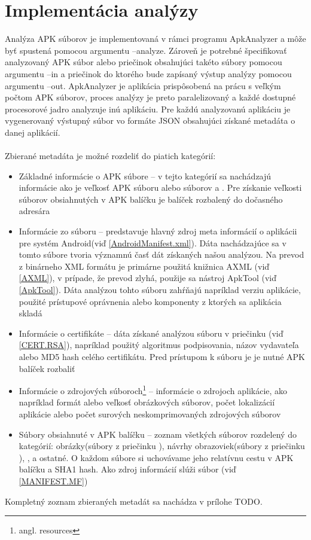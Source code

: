 \section{Implementácia analýzy}
Analýza APK súborov je implementovaná v rámci programu ApkAnalyzer a môže byť spustená pomocou argumentu –analyze. Zároveň je potrebné špecifikovať analyzovaný APK súbor alebo priečinok obsahujúci takéto súbory pomocou argumentu –in a priečinok do ktorého bude zapísaný výstup analýzy pomocou argumentu –out. ApkAnalyzer je aplikácia prispôsobená na prácu s veľkým počtom APK súborov, proces analýzy je preto paralelizovaný a každé dostupné procesorové jadro analyzuje inú aplikáciu. Pre každú analyzovanú aplikáciu je vygenerovaný výstupný súbor vo formáte JSON obsahujúci získané metadáta o danej aplikácií. \\\\
Zbierané metadáta je možné rozdeliť do piatich kategórií:
\begin{itemize}
\item Základné informácie o APK súbore -- v tejto kategórií sa nachádzajú informácie ako je veľkosť APK súboru alebo súborov  a . Pre získanie veľkosti súborov obsiahnutých v APK balíčku je balíček rozbalený do dočasného adresára
\item Informácie zo súboru  --  predstavuje hlavný zdroj meta informácií o aplikácii pre systém Android(viď \ref{AndroidManifest.xml}). Dáta nachádzajúce sa v tomto súbore tvoria významnú časť dát získaných našou analýzou. Na prevod z binárneho XML formátu je primárne použitá knižnica AXML (viď \ref{AXML}), v prípade, že prevod zlyhá, použije sa nástroj ApkTool (viď \ref{ApkTool}). Dáta analýzou tohto súboru zahŕňajú napríklad verziu aplikácie, použité prístupové oprávnenia alebo komponenty z ktorých sa aplikácia skladá
\item Informácie o certifikáte -- dáta získané analýzou súboru  v priečinku (viď \ref{CERT.RSA}), napríklad použitý algoritmus podpisovania, názov vydavateľa alebo MD5 hash celého certifikátu. Pred prístupom k súboru je  je nutné APK balíček rozbaliť
\item Informácie o zdrojových súboroch\footnote{angl. resources} -- informácie o zdrojoch aplikácie, ako napríklad formát alebo veľkosť obrázkových súborov, počet lokalizácií aplikácie alebo počet surových neskomprimovaných zdrojových súborov
\item Súbory obsiahnuté v APK balíčku -- zoznam všetkých súborov rozdelený do kategórií: obrázky(súbory z priečinku ), návrhy obrazoviek(súbory z priečinku ), ,  a ostatné. O každom súbore si uchovávame jeho relatívnu cestu v APK balíčku a SHA1 hash. Ako zdroj informácií slúži súbor  (viď \ref{MANIFEST.MF})
\end{itemize}

\noindent Kompletný zoznam zbieraných metadát sa nachádza v prílohe TODO.  